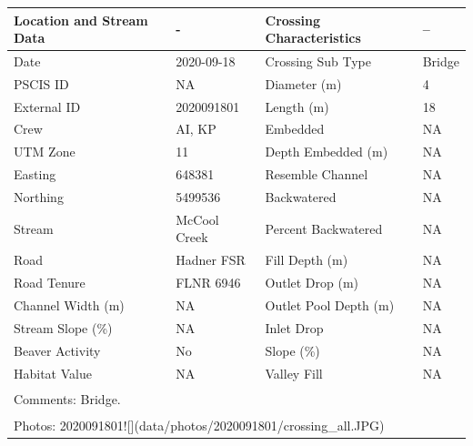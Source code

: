 \documentclass[
]{book}
\begin{document}
\begin{tabular}{l|l|l|l}
\hline
Location and Stream Data & - & Crossing Characteristics & --\\
\hline
Date & 2020-09-18 & Crossing Sub Type & Bridge\\
\hline
PSCIS ID & NA & Diameter (m) & 4\\
\hline
External ID & 2020091801 & Length (m) & 18\\
\hline
Crew & AI, KP & Embedded & NA\\
\hline
UTM Zone & 11 & Depth Embedded (m) & NA\\
\hline
Easting & 648381 & Resemble Channel & NA\\
\hline
Northing & 5499536 & Backwatered & NA\\
\hline
Stream & McCool Creek & Percent Backwatered & NA\\
\hline
Road & Hadner FSR & Fill Depth (m) & NA\\
\hline
Road Tenure & FLNR 6946 & Outlet Drop (m) & NA\\
\hline
Channel Width (m) & NA & Outlet Pool Depth (m) & NA\\
\hline
Stream Slope (\%) & NA & Inlet Drop & NA\\
\hline
Beaver Activity & No & Slope (\%) & NA\\
\hline
Habitat Value & NA & Valley Fill & NA\\
\hline
\multicolumn{4}{l}{\textsuperscript{} Comments: Bridge.}\\
\multicolumn{4}{l}{\textsuperscript{} Photos: 2020091801![](data/photos/2020091801/crossing\_all.JPG)}\\
\end{tabular}
\end{document}
